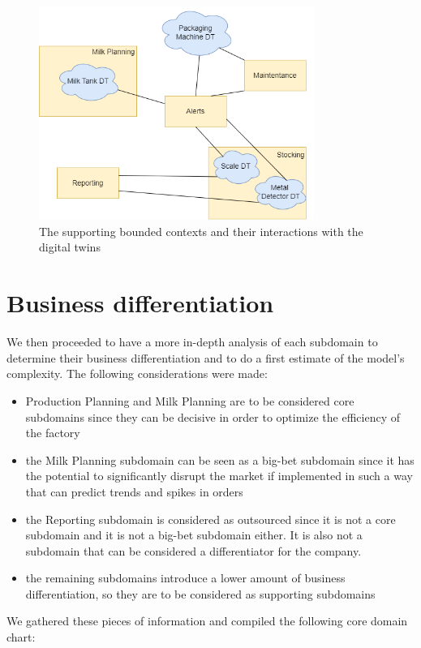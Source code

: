 \begin{figure}[H]
    \centering
    \includegraphics[width=0.8\textwidth]{img/subdomains-dt.png}
    \caption{The supporting bounded contexts and their interactions with the digital twins}
    \label{img:subdomains-dt}
\end{figure}

\section{Business differentiation}
We then proceeded to have a more in-depth analysis of each subdomain to determine their business differentiation and to do a first estimate of the model's complexity. The following considerations were made:
\begin{itemize}
	\item Production Planning and Milk Planning are to be considered core subdomains since they can be decisive in order to optimize the efficiency of the factory
	\item the Milk Planning subdomain can be seen as a big-bet subdomain since it has the potential to significantly disrupt the market if implemented in such a way that can predict trends and spikes in orders
	\item the Reporting subdomain is considered as outsourced since it is not a core subdomain and it is not a big-bet subdomain either. It is also not a subdomain that can be considered a differentiator for the company.
	\item the remaining subdomains introduce a lower amount of business differentiation, so they are to be considered as supporting subdomains
\end{itemize}

We gathered these pieces of information and compiled the following core domain chart:

